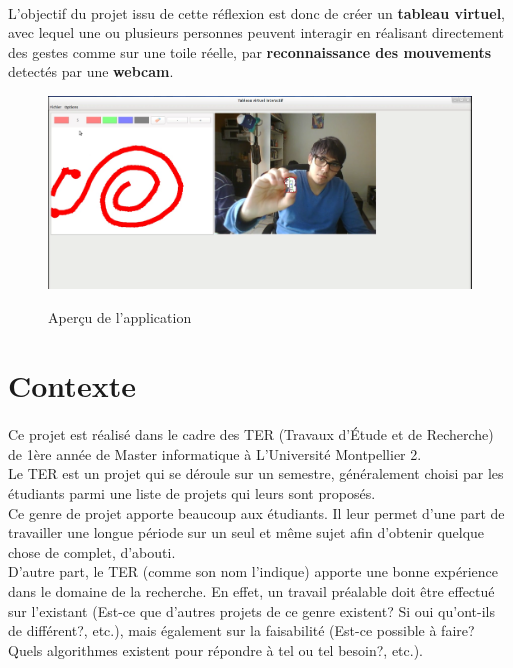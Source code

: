 \documentclass{report}
\begin{document}
		 \paragraph{}
		 L'objectif du projet issu de cette réflexion est donc de créer un \textbf{tableau virtuel}, avec lequel une ou plusieurs personnes peuvent interagir en réalisant directement des gestes comme sur une toile réelle, par \textbf{reconnaissance des mouvements} detectés par une \textbf{webcam}. \\
		\begin{figure}[!h]
			\centering
			\includegraphics[scale=0.3]{../images/capture-intro.png}\\
			\caption{Aperçu de l'application}
			\label{Aperçu de l'application}
		\end{figure}
	\newpage
		\section{Contexte}
		\paragraph{}
		Ce projet est réalisé dans le cadre des TER (Travaux d'Étude et de Recherche) de 1ère année de Master informatique à L'Université Montpellier 2. \\
		Le TER est un projet qui se déroule sur un semestre, généralement choisi par les étudiants parmi une liste de projets qui leurs sont proposés. \\Ce genre de projet apporte beaucoup aux étudiants. Il leur permet d'une part de travailler une longue période sur un seul et même sujet afin d'obtenir quelque chose de complet, d'abouti. \\D'autre part, le TER (comme son nom l'indique) apporte une bonne expérience dans le domaine de la recherche. En effet, un travail préalable doit être effectué sur l'existant (Est-ce que d'autres projets de ce genre existent? Si oui qu'ont-ils de différent?, etc.), mais également sur la faisabilité (Est-ce possible à faire? Quels algorithmes existent pour répondre à tel ou tel besoin?, etc.).
\end{document}
